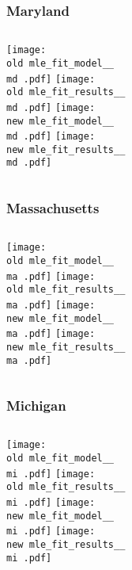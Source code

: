 \documentclass{beamer}
\newcommand{\old}{api-370-prod/pyseir/state_summaries/reports/}
\newcommand{\new}{new/pyseir/state_summaries/reports/}
\newcommand{\md}{Maryland__24}
\newcommand{\ma}{Massachusetts__25}
\newcommand{\mi}{Michigan__26}
\begin{document}
\begin{frame}
\frametitle{Maryland}
    \begin{columns}[t]

       \texttt{[image: \\old mle\_fit\_model\_\_\\md .pdf]}
       \texttt{[image: \\old mle\_fit\_results\_\_\\md .pdf]}   
       \texttt{[image: \\new mle\_fit\_model\_\_\\md .pdf]}
       \texttt{[image: \\new mle\_fit\_results\_\_\\md .pdf]}   
\end{columns}
\end{frame}

\begin{frame}
\frametitle{Massachusetts}
    \begin{columns}[t]

       \texttt{[image: \\old mle\_fit\_model\_\_\\ma .pdf]}
       \texttt{[image: \\old mle\_fit\_results\_\_\\ma .pdf]}   
       \texttt{[image: \\new mle\_fit\_model\_\_\\ma .pdf]}
       \texttt{[image: \\new mle\_fit\_results\_\_\\ma .pdf]}   
\end{columns}
\end{frame}

\begin{frame}
\frametitle{Michigan}
    \begin{columns}[t]

       \texttt{[image: \\old mle\_fit\_model\_\_\\mi .pdf]}
       \texttt{[image: \\old mle\_fit\_results\_\_\\mi .pdf]}   
       \texttt{[image: \\new mle\_fit\_model\_\_\\mi .pdf]}
       \texttt{[image: \\new mle\_fit\_results\_\_\\mi .pdf]}   
\end{columns}
\end{frame}
\end{document}
